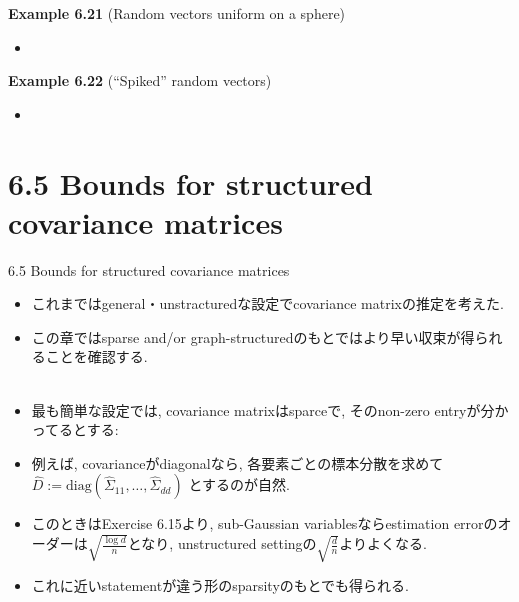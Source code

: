 \documentclass[unicode,aspectratio=169,11pt]{beamer}
\begin{document}
\begin{frame}{}{}
  {\bf Example 6.21} (Random vectors uniform on a sphere)
  \begin{itemize}
    \item 
  \end{itemize}
\end{frame}

\begin{frame}{}{}
  {\bf Example 6.22} (``Spiked'' random vectors)
  \begin{itemize}
    \item 
  \end{itemize}
\end{frame}

\section{6.5 Bounds for structured covariance matrices}
\begin{frame}{6.5 Bounds for structured covariance matrices}{}
  \begin{itemize}
    \item これまではgeneral・unstracturedな設定でcovariance matrixの推定を考えた.
    \item この章ではsparse and/or graph-structuredのもとではより早い収束が得られることを確認する.\\
          　
    \item 最も簡単な設定では, covariance matrixはsparceで, そのnon-zero entryが分かってるとする:
    \item 例えば, covarianceがdiagonalなら,
      各要素ごとの標本分散を求めて$\widehat{D}:=\mathrm{diag}(\widehat{\Sigma}_{11}, \dots, \widehat{\Sigma}_{dd})$
      とするのが自然.
    \item このときはExercise 6.15より, sub-Gaussian variablesならestimation errorのオーダーは$\sqrt{\frac{\log d}{n}}$となり, unstructured settingの$\sqrt{\frac{d}{n}}$よりよくなる.
    \item これに近いstatementが違う形のsparsityのもとでも得られる.
  \end{itemize}
\end{frame}
\end{document}
